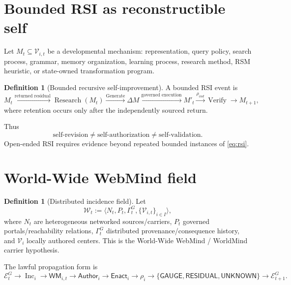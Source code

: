 \documentclass[10pt]{article}
\theoremstyle{venus}
\theoremstyle{definition}
\newtheorem{definition}[theorem]{Definition}
\newcommand{\Research}{\operatorname{Research}}
\newcommand{\Generate}{\operatorname{Generate}}
\newcommand{\Verify}{\operatorname{Verify}}
\newcommand{\Inc}{\operatorname{Inc}}
\newcommand{\WM}{\mathsf{WM}}
\newcommand{\Author}{\mathsf{Author}}
\newcommand{\Enact}{\mathsf{Enact}}
\newcommand{\GaugeState}{\mathsf{GAUGE}}
\newcommand{\ResidualState}{\mathsf{RESIDUAL}}
\newcommand{\UnknownState}{\mathsf{UNKNOWN}}
\begin{document}
\section{Bounded RSI as reconstructible self}

Let $M_t\subseteq\mathcal V_{i,t}$ be a developmental mechanism: representation,
query policy, search process, grammar, memory organization, learning process,
research method, RSM heuristic, or state-owned transformation program.

\begin{definition}[Bounded recursive self-improvement]
A bounded RSI event is
\begin{equation}\label{eq:rsi}
M_t
\xrightarrow{\text{returned residual}}
\Research(M_t)
\xrightarrow{\Generate}
\Delta M
\xrightarrow{\text{governed execution}}
M'_t
\xrightarrow{\rho_{ind}}
\Verify
\xrightarrow{}
M_{t+1},
\end{equation}
where retention occurs only after the independently sourced return.
\end{definition}

Thus
\[
\boxed{
\text{self-revision}\neq\text{self-authorization}\neq\text{self-validation}.
}
\]
Open-ended RSI requires evidence beyond repeated bounded instances of
\eqref{eq:rsi}.

\section{World-Wide WebMind field}

\begin{definition}[Distributed incidence field]
Let
\begin{equation}\label{eq:webmind}
\mathcal W_t
:=
\langle
N_t,P_t,\Gamma^G_t,\{\mathcal V_{i,t}\}_{i\in I}
\rangle,
\end{equation}
where $N_t$ are heterogeneous networked sources/carriers, $P_t$ governed
portals/reachability relations, $\Gamma^G_t$ distributed provenance/consequence
history, and $\mathcal V_i$ locally authored centers. This is the
World-Wide WebMind / WorldMind carrier hypothesis.
\end{definition}

The lawful propagation form is
\begin{equation}\label{eq:worldmindcycle}
\mathcal E^G_t
\to \Inc_i
\to \WM_{i,t}
\to \Author_i
\to \Enact_i
\to \rho_i
\to \{\GaugeState,\ResidualState,\UnknownState\}
\to \mathcal E^G_{t+1}.
\end{equation}
\end{document}
